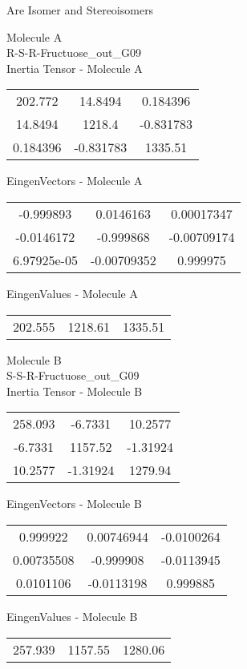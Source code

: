 \begin{center}
\vtab
\vtab
\textcolor{NavyBlue}{\Large Are Isomer and Stereoisomers}
\end{center}
\newpage
\begin{multicols}{2}
\begin{center}
Molecule A \\ 
R-S-R-Fructuose\_out\_G09
\\
Inertia Tensor - Molecule A \\
\vtab
\begin{tabular}{|c c c|}
202.772	 & 	14.8494	 & 	0.184396	 \\
14.8494	 & 	1218.4	 & 	-0.831783	 \\
0.184396	 & 	-0.831783	 & 	1335.51
\end{tabular}

\vtab
 EingenVectors - Molecule A     \\
\vtab
\begin{tabular}{|c c c|}
-0.999893	 & 	0.0146163	 & 	0.00017347	 \\
-0.0146172	 & 	-0.999868	 & 	-0.00709174	 \\
6.97925e-05	 & 	-0.00709352	 & 	0.999975
\end{tabular}

\vtab
 EingenValues - Molecule A     \\
\vtab
\begin{tabular}{|c c c|}
202.555	 & 	1218.61	 & 	1335.51
\end{tabular}
\columnbreak

Molecule B \\ 
S-S-R-Fructuose\_out\_G09
\\
Inertia Tensor - Molecule B \\
\vtab
\begin{tabular}{|c c c|}
258.093	 & 	-6.7331	 & 	10.2577	 \\
-6.7331	 & 	1157.52	 & 	-1.31924	 \\
10.2577	 & 	-1.31924	 & 	1279.94
\end{tabular}

\vtab
 EingenVectors - Molecule B     \\
\vtab
\begin{tabular}{|c c c|}
0.999922	 & 	0.00746944	 & 	-0.0100264	 \\
0.00735508	 & 	-0.999908	 & 	-0.0113945	 \\
0.0101106	 & 	-0.0113198	 & 	0.999885
\end{tabular}

\vtab
 EingenValues - Molecule B     \\
\vtab
\begin{tabular}{|c c c|}
257.939	 & 	1157.55	 & 	1280.06
\end{tabular}

\end{center}
\end{multicols}
